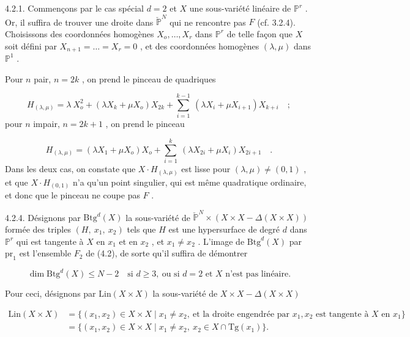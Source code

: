 4.2.1. Commençons par le cas spécial $d = 2$ et $X$ une sous-variété linéaire de $\mathbb{P}^r$ . Or, il suffira de trouver une droite dans $\check{\mathbb{P}}^N$ qui ne rencontre pas $F$ (cf. 3.2.4). Choisissons des coordonnées homogènes $X_o,\ldots,X_r$ dans $\mathbb{P}^r$ de telle façon que $X$ soit défini par
$X_{n+1} = \ldots = X_r = 0$ , et des coordonnées homogènes $(\lambda, \mu)$ dans $\mathbb{P}^1$ .

Pour $n$ pair, $n = 2k$ , on prend le pinceau de quadriques

\begin{equation}\tag{4.2.2}
H_{(\lambda,\mu)} = \lambda\ X_o^2 + (\lambda X_k + \mu X_o) X_{2k} + \sum_{i=1}^{k-1}\ (\lambda X_i + \mu X_{i+1}) X_{k+i} \quad ;
\end{equation}
pour $n$ impair, $n = 2k+1$ , on prend le pinceau

\begin{equation}\tag{4.2.3}
H_{(\lambda,\mu)} = (\lambda X_1 + \mu X_o) X_o + \sum_{i=1}^{k}\ (\lambda X_{2i} + \mu X_i) X_{2i+1} \quad .
\end{equation}
Dans les deux cas, on constate que $X \cdot H_{(\lambda,\mu)}$ est lisse pour $(\lambda,\mu) \neq (0,1)$ , et que $X \cdot H_{(0,1)}$ n'a qu'un point singulier, qui est même quadratique ordinaire, et donc que le pinceau ne coupe pas $F$ .

4.2.4. Désignons par $\mathrm{Btg}^d(X)$ la sous-variété de $\check{\mathbb{P}}^N \times (X \times X - \Delta(X \times X))$ formée des triples $(H,\ x_1,\ x_2)$ tels que $H$ est une hypersurface de degré $d$ dans $\mathbb{P}^r$ qui est tangente à $X$ en $x_1$ et en $x_2$ , et $x_1 \neq x_2$ . L'image de $\mathrm{Btg}^d(X)$ par $\mathrm{pr}_1$ est l'ensemble $F_2$ de (4.2), de sorte qu'il suffira de démontrer

\begin{equation}\tag{4.2.5}
\dim \mathrm{Btg}^d(X) \leq N-2
\quad\mbox{si } d \geq 3,\ \mbox{ou si } d = 2
\mbox{ et } X \mbox{ n'est pas linéaire}.
\end{equation}

Pour ceci, désignons par $\mathrm{Lin}(X \times X)$ la sous-variété de $X \times X - \Delta(X \times X)$

\begin{equation}\tag{4.2.6}
\begin{aligned}
\mathrm{Lin}(X \times X)
&= \{(x_1,x_2) \in X \times X \mid x_1 \neq x_2,\ 
\text{et la droite engendrée par }x_1,x_2
\text{ est tangente à }X\text{ en }x_1\}\\
&= \{(x_1,x_2) \in X \times X \mid x_1 \neq x_2,\ 
x_2 \in X \cap \mathrm{Tg}(x_1)\}.
\end{aligned}
\end{equation}


